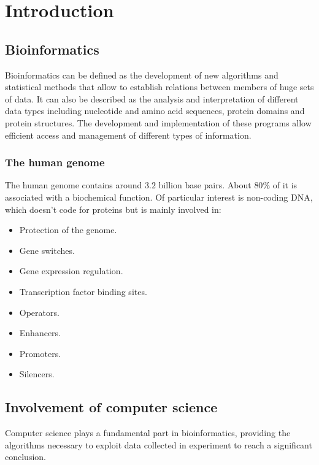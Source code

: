 \graphicspath{{chapters/01/images/}}
\chapter{Introduction}

\section{Bioinformatics}
Bioinformatics can be defined as the development of new algorithms and statistical methods that allow to establish relations between members of huge sets of data.
It can also be described as the analysis and interpretation of different data types including nucleotide and amino acid sequences, protein domains and protein structures.
The development and implementation of these programs allow efficient access and management of different types of information.

	\subsection{The human genome}
	The human genome contains around $3.2$ billion base pairs.
	About $80\%$ of it is associated with a biochemical function.
	Of particular interest is non-coding DNA, which doesn't code for proteins but is mainly involved in:

	\begin{multicols}{3}
		\begin{itemize}
			\item Protection of the genome.
			\item Gene switches.
			\item Gene expression regulation.
			\item Transcription factor binding sites.
			\item Operators.
			\item Enhancers.
			\item Promoters.
			\item Silencers.
		\end{itemize}
	\end{multicols}

\section{Involvement of computer science}
Computer science plays a fundamental part in bioinformatics, providing the algorithms necessary to exploit data collected in experiment to reach a significant conclusion.

